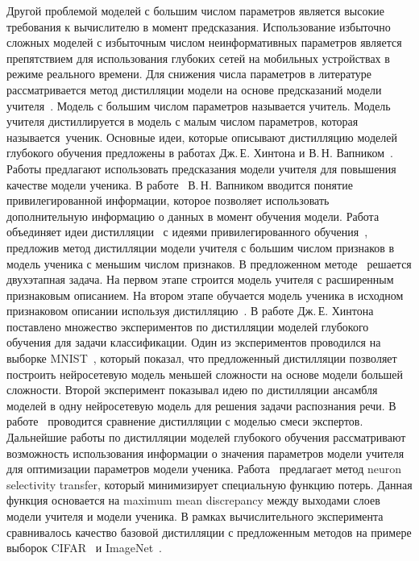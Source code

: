 Другой проблемой моделей с большим числом параметров является высокие требования к вычислителю в момент предсказания. Использование избыточно сложных моделей с избыточным числом неинформативных параметров является препятствием для использования глубоких сетей на мобильных устройствах в режиме реального времени.
Для снижения числа параметров в литературе рассматривается метод дистилляции модели на основе предсказаний модели учителя~\cite{Hinton2015, Vapnik2015, Lopez2016}.
Модель с большим числом параметров называется учитель. Модель учителя дистиллируется в модель с малым числом параметров, которая называется~ученик.
Основные идеи, которые описывают дистилляцию моделей глубокого обучения предложены в работах Дж.\,Е. Хинтона и В.\,Н. Вапником~\cite{Hinton2015, Vapnik2015, Lopez2016}.
Работы предлагают использовать предсказания модели учителя для повышения качестве модели ученика.
В работе~\cite{Vapnik2015} В.\,Н. Вапником вводится понятие привилегированной информации, которое позволяет использовать дополнительную информацию о данных в момент обучения модели.
Работа~\cite{Lopez2016} объединяет идеи дистилляции~\cite{Hinton2015} с идеями привилегированного обучения~\cite{Vapnik2015}, предложив метод дистилляции модели учителя с большим числом признаков в модель ученика с меньшим числом признаков.
В предложенном методе~\cite{Lopez2016} решается двухэтапная задача. На первом этапе строится модель учителя с расширенным признаковым описанием.
На втором этапе обучается модель ученика в исходном признаковом описании используя дистилляцию~\cite{Hinton2015}.
В работе Дж.\,Е. Хинтона~\cite{Hinton2015} поставлено множество экспериментов по дистилляции моделей глубокого обучения для задачи классификации.
Один из экспериментов проводился на выборке MNIST~\cite{mnist}, который показал, что предложенный дистилляции позволяет построить нейросетевую модель меньшей сложности на основе модели большей сложности.
Второй эксперимент показывал идею по дистилляции ансамбля моделей в одну нейросетевую модель для решения задачи распознания речи. В работе~\cite{Hinton2015} проводится сравнение дистилляции с моделью смеси экспертов.
Дальнейшие работы по дистилляции моделей глубокого обучения рассматривают возможность использования информации о значения параметров модели учителя для оптимизации параметров модели ученика. Работа~\cite{Zehao2017} предлагает метод neuron selectivity transfer, который минимизирует специальную функцию потерь. Данная функция основается на maximum mean discrepancy между выходами слоев модели учителя и модели ученика. В рамках вычислительного эксперимента сравнивалось качество базовой дистилляции с предложенным методов на примере выборок CIFAR~\cite{cifar10} и ImageNet~\cite{imagenet}.

